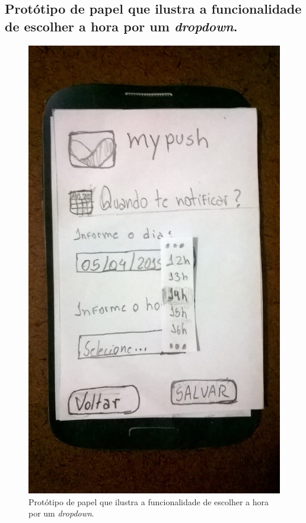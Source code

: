 \begin{anexosenv}
    \pagebreak
    \section*{Protótipo de papel que ilustra a funcionalidade de escolher a hora por um \textit{dropdown}.}
    
      \begin{figure}[!htbp]
	\centering
	\includegraphics[scale=0.32, angle=-90]{editaveis/figuras/prototipo_papel_v1/quando_notificar_horario}
	\caption{Protótipo de papel que ilustra a funcionalidade de escolher a hora por um \textit{dropdown}.}
	\label{quando_notificar_horario_v1}
      \end{figure}
      

\end{anexosenv}
